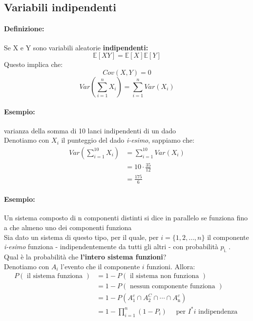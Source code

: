 \documentclass[]{article}
\newcommand{\ev}{\mathbb{E}[X]}
\renewcommand{\ev}[1]{\mathbb{E}[#1]}
\newcommand{\definizione}{\paragraph{Definizione:}}
\begin{document}
    \subsection{Variabili indipendenti}
    \definizione Se X e Y sono variabili aleatorie \textbf{indipendenti:}
    \[ \ev{XY} = \ev{X} \ev{Y} \]
    Questo implica che:
    \[ Cov(X, Y) = 0 \]
    \[ \displaystyle{Var(\sum_{i = 1}^{n} X_i) = \sum_{i = 1}^{n} Var(X_i)}\]
    \paragraph{Esempio:} varianza della somma di 10 lanci indipendenti di un dado \\
    Denotiamo con \textbf{$X_i$} il punteggio del dado \textit{i-esimo}, sappiamo che:
    \begin{equation*}
        \begin{split}
            Var(\sum_{i = 1}^{10} X_i) &= \sum_{i = 1}^{10} Var(X_i) \\
            & = 10 \cdot \frac{35}{12} \\
            & = \frac{175}{6}
        \end{split}
    \end{equation*}
    \paragraph{Esempio:} Un sistema composto di n componenti distinti si dice in parallelo se funziona fino a che almeno uno dei componenti funziona \\
    Sia dato un sistema di questo tipo, per il quale, per $i=\{1,2, \ldots, n\}$ il componente \textit{i-esimo} funziona - indipendentemente da tutti gli altri - con probabilità $p_{\text {i. }}$. \\
    Qual è la probabilità che \textbf{l'intero sistema funzioni}? \\
    Denotiamo con $A_i$ l'evento che il componente $i$ funzioni. Allora:
    $$
    \begin{aligned}
    P(\text { il sistema funziona }) & =1-P(\text { il sistema non funziona }) \\
    & =1-P(\text { nessun componente funziona }) \\
    & =1-P\left(A_1^c \cap A_2^C \cap \cdots \cap A_{\mathrm{n}}^c\right) \\
    & =1-\prod_{i=1}^n\left(1-P_i\right) \quad \text { per } I^* i \text { indipendenza }
    \end{aligned}
    $$
    
\end{document}

